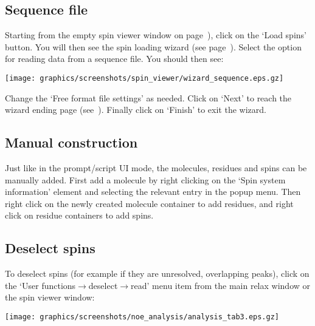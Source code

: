 \subsection{Sequence file} \label{sect: GUI - sequence file}

Starting from the empty spin viewer window on page~\pageref{figure: spin viewer blank}), click on the `Load spins' button.  You will then see the spin loading wizard (see page~\pageref{figure: spin viewer wizard start}).  Select the option for reading data from a sequence file.  You should then see:

\begin{minipage}[h]{\linewidth}
\centerline{\texttt{[image: graphics/screenshots/spin\_viewer/wizard\_sequence.eps.gz]}}
\end{minipage}

Change the `Free format file settings' as needed.  Click on `Next' to reach the wizard ending page (see~\pageref{figure: spin viewer end}).  Finally click on `Finish' to exit the wizard.



\subsection{Manual construction} \label{sect: GUI - manual construction}

Just like in the prompt/script UI mode, the molecules, residues and spins can be manually added.  First add a molecule by right clicking on the `Spin system information' element and selecting the relevant entry in the popup menu.  Then right click on the newly created molecule container to add residues, and right click on residue containers to add spins.



\subsection{Deselect spins} \label{sect: GUI - deselect spins}

To deselect spins (for example if they are unresolved, overlapping peaks), click on the `User functions$\to$deselect$\to$read' menu item from the main relax window or the spin viewer window:

\begin{minipage}[h]{\linewidth}
\centerline{\texttt{[image: graphics/screenshots/noe\_analysis/analysis\_tab3.eps.gz]}}
\end{minipage}

